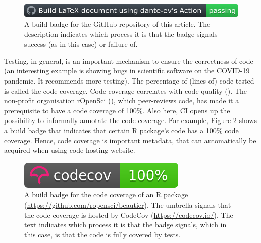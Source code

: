 \begin{figure}[!htbp]
  \centering
  \includegraphics[width=\linewidth]{build_badge.png}
  \caption{
    A build badge for the GitHub repository of this article.
    The description indicates which process it is that the badge
    signals success (as in this case) or failure of. 
  }
  \label{fig:build_badge}
\end{figure}


Testing, in general, is an important mechanism to ensure
the correctness of code (an interesting example is \cite{rahman2020exploratory}
showing bugs in scientific software on the COVID-19 pandemic. 
It recommends more testing).
The percentage of (lines of) code tested is called the code coverage.
Code coverage correlates with code quality (\cite{horgan1994,del1995correlation}). 
The non-profit organisation rOpenSci (\cite{ram2018community}),
which peer-reviews code,
has made it a prerequisite to have a code coverage of 100\%.
Also here, CI opens up the possibility to informally annotate the
code coverage. For example, Figure \ref{fig:badge_codecov} shows a 
build badge that indicates that certain R package's code 
has a 100\% code coverage.
Hence, code coverage is important metadata, that can automatically
be acquired when using code hosting website.

\begin{figure}[!htbp]
  \centering
  \includegraphics[]{badge_codecov.png}
  \caption{
    A build badge for the code coverage of an R 
    package (\url{https://github.com/ropensci/beautier}).
    The umbrella signals that the code coverage is hosted by
    CodeCov (\url{https://codecov.io/}). 
    The text indicates which process it is that the badge
    signals, which in this case, is that the code is fully covered
    by tests.
  }
  \label{fig:badge_codecov}
\end{figure}


